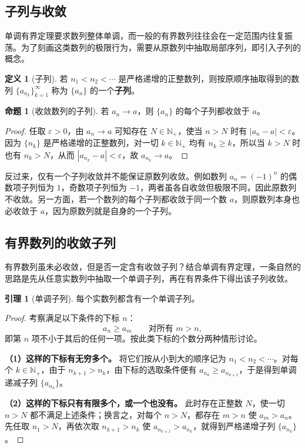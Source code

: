 \documentclass[UTF8, fontset=fandol, a4paper, 12pt]{ctexart}
\newcommand{\Nplus}{\mathbb N_{+}}
\theoremstyle{definition}
\newtheorem*{definition}{定义}
\newtheorem*{lemma}{引理}
\newtheorem*{proposition}{命题}
\begin{document}
\subsection*{子列与收敛}
单调有界定理要求数列整体单调，而一般的有界数列往往会在一定范围内往复振荡。为了刻画这类数列的极限行为，需要从原数列中抽取局部序列，即引入子列的概念。

\begin{definition}[子列]
若 $n_1<n_2<\cdots$ 是严格递增的正整数列，则按原顺序抽取得到的数列
$\{a_{n_k}\}_{k=1}^{\infty}$ 称为 $\{a_n\}$ 的一个\textbf{子列}。
\end{definition}

\begin{proposition}[收敛数列的子列]
若 $a_n\to a$，则 $\{a_n\}$ 的每个子列都收敛于 $a$。
\end{proposition}
\begin{proof}
任取 $\varepsilon>0$，由 $a_n\to a$ 可知存在 $N\in\Nplus$，使当 $n>N$ 时有 $|a_n-a|<\varepsilon$。因为 $\{n_k\}$ 是严格递增的正整数列，对一切 $k\in\Nplus$ 均有 $n_k\ge k$，所以当 $k>N$ 时也有 $n_k>N$，从而 $|a_{n_k}-a|<\varepsilon$，故 $a_{n_k}\to a$。
\end{proof}

反过来，仅有一个子列收敛并不能保证原数列收敛。例如数列 $a_n=(-1)^n$ 的偶数项子列恒为 $1$，奇数项子列恒为 $-1$，两者虽各自收敛但极限不同，因此原数列不收敛。另一方面，若一个数列的每个子列都收敛于同一个数 $a$，则原数列本身也必收敛于 $a$，因为原数列就是自身的一个子列。

\subsection*{有界数列的收敛子列}
有界数列虽未必收敛，但是否一定含有收敛子列？结合单调有界定理，一条自然的思路是先从任意实数列中抽取一个单调子列，再在有界条件下得出该子列收敛。

\begin{lemma}[单调子列]
每个实数列都含有一个单调子列。
\end{lemma}
\begin{proof}
考察满足以下条件的下标 $n$：
\[
a_n\ge a_m\qquad\text{对所有 }m>n,
\]
即第 $n$ 项不小于其后的任何一项。按此类下标的个数分两种情形讨论。

\textbf{（1）这样的下标有无穷多个。} 将它们按从小到大的顺序记为 $n_1<n_2<\cdots$。对每个 $k\in\Nplus$，由于 $n_{k+1}>n_k$，由下标的选取条件便有 $a_{n_k}\ge a_{n_{k+1}}$，于是得到单调递减子列 $\{a_{n_k}\}$。

\textbf{（2）这样的下标只有有限多个，或一个也没有。} 此时存在正整数 $N$，使一切 $n>N$ 都不满足上述条件；换言之，对每个 $n>N$，都存在 $m>n$ 使 $a_m>a_n$。先任取 $n_1>N$，再依次取 $n_{k+1}>n_k$ 使 $a_{n_{k+1}}>a_{n_k}$，就得到严格递增子列 $\{a_{n_k}\}$。
\end{proof}
\end{document}
